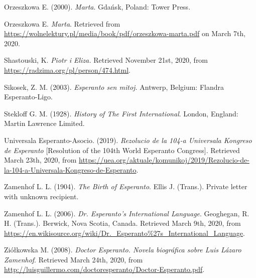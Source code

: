 Orzeszkowa E. (2000). \textit{Marta}. Gdańsk, Poland: Tower Press.

Orzeszkowa E. \textit{Marta}. Retrieved from \url{https://wolnelektury.pl/media/book/pdf/orzeszkowa-marta.pdf} on March 7th, 2020.


Shastouski, K. \textit{Piotr i Eliza.} Retrieved November 21st, 2020, from \url{https://radzima.org/pl/person/474.html}.

Sikosek, Z. M. (2003). \textit{Esperanto sen mitoj.} Antwerp, Belgium: Flandra Esperanto-Ligo. 

Stekloff G. M. (1928). \textit{History of The First International}. London, England: Martin Lawrence Limited.

Universala Esperanto-Asocio. (2019). \textit{Rezolucio de la 104-a Universala Kongreso de Esperanto} [Resolution of the 104th World Esperanto Congress]. Retrieved March 23th, 2020, from \url{https://uea.org/aktuale/komunikoj/2019/Rezolucio-de-la-104-a-Universala-Kongreso-de-Esperanto}.

Zamenhof L. L. (1904). \textit{The Birth of Esperanto}. Ellis J. (Trans.). Private letter with unknown recipient.

Zamenhof L. L. (2006). \textit{Dr. Esperanto's International Language}. Geoghegan, R. H. (Trans.). Berwick, Nova Scotia, Canada. Retrieved March 9th, 2020, from \url{https://en.wikisource.org/wiki/Dr._Esperanto\%27s_International_Language}.

Ziółkowska M. (2008). \textit{Doctor Esperanto. Novela biográfica sobre Luis Lázaro Zamenhof}. Retrieved March 24th, 2020, from \url{http://luisguillermo.com/doctoresperanto/Doctor-Esperanto.pdf}.
